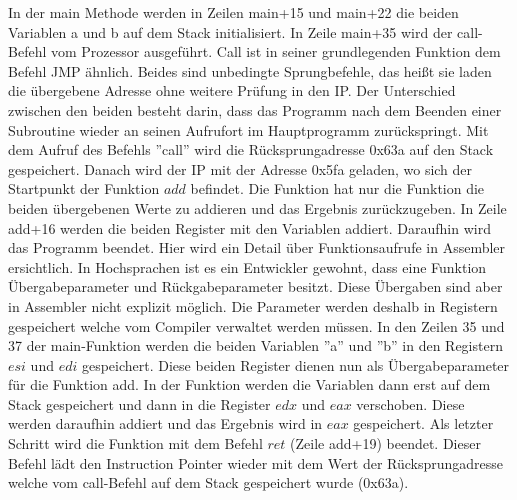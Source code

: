 \documentclass[12pt]{article}
\begin{document}
\par\smallskip\noindent In der main Methode werden in Zeilen main+15 und main+22 die beiden Variablen a und b auf dem Stack initialisiert. In Zeile main+35 wird der call-Befehl vom Prozessor ausgeführt. Call ist in seiner grundlegenden Funktion dem Befehl JMP ähnlich. Beides sind unbedingte Sprungbefehle, das heißt sie laden die übergebene Adresse ohne weitere Prüfung in den IP. Der Unterschied zwischen den beiden besteht darin, dass das Programm nach dem Beenden einer Subroutine wieder an seinen Aufrufort im Hauptprogramm zurückspringt. Mit dem Aufruf des Befehls ''call'' wird die Rücksprungadresse 0x63a auf den Stack gespeichert. Danach wird der IP mit der Adresse 0x5fa geladen, wo sich der Startpunkt der Funktion $add$ befindet. Die Funktion hat nur die Funktion die beiden übergebenen Werte zu addieren und das Ergebnis zurückzugeben. In Zeile add+16 werden die beiden Register mit den Variablen addiert. Daraufhin wird das Programm beendet. Hier wird ein Detail über Funktionsaufrufe in Assembler ersichtlich. In Hochsprachen ist es ein Entwickler gewohnt, dass eine Funktion Übergabeparameter und Rückgabeparameter besitzt. Diese Übergaben sind aber in Assembler nicht explizit möglich. Die Parameter werden deshalb in Registern gespeichert welche vom Compiler verwaltet werden müssen. In den Zeilen 35 und 37 der main-Funktion werden die beiden Variablen ''a'' und ''b'' in den Registern $esi$ und $edi$ gespeichert. Diese beiden Register dienen nun als Übergabeparameter für die Funktion add. In der Funktion werden die Variablen dann erst auf dem Stack gespeichert und dann in die Register $edx$ und $eax$ verschoben. Diese werden daraufhin addiert und das Ergebnis wird in $eax$ gespeichert. Als letzter Schritt wird die Funktion mit dem Befehl $ret$ (Zeile add+19) beendet. Dieser Befehl lädt den Instruction Pointer wieder mit dem Wert der Rücksprungadresse welche vom call-Befehl auf dem Stack gespeichert wurde (0x63a).
\end{document}

